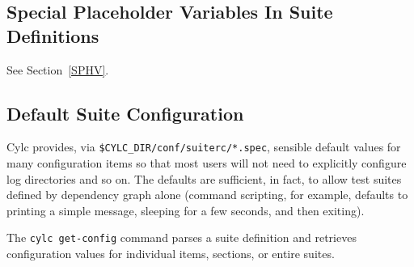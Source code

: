 
\subsection{Special Placeholder Variables In Suite Definitions}

See Section~\ref{SPHV}.


\subsection{Default Suite Configuration}
\label{SuiteDefaults}

Cylc provides, via \lstinline=$CYLC_DIR/conf/suiterc/*.spec=, sensible
default values for many configuration items so that most users will not
need to explicitly configure log directories and so on. The defaults are
sufficient, in fact, to allow test suites defined by dependency graph
alone (command scripting, for example, defaults to printing a simple
message, sleeping for a few seconds, and then exiting). 

The \lstinline=cylc get-config= command parses a suite definition and
retrieves configuration values for individual items, sections, or entire
suites.

